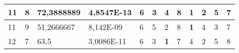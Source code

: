 \documentclass[conference]{IEEEtran}
\begin{document}
\begin{table*}[]
\begin{tabular}{|llll|llllllll|}
\multicolumn{1}{|l|}{11}                                                    & \multicolumn{1}{l|}{8}                                                        & \multicolumn{1}{l|}{72,3888889}                                                   & 4,8547E-13                     & \multicolumn{1}{l|}{6}                                                  & \multicolumn{1}{l|}{3}                                                  & \multicolumn{1}{l|}{4}                                                  & \multicolumn{1}{l|}{8}                                                  & \multicolumn{1}{l|}{\textbf{1}}                                         & \multicolumn{1}{l|}{2}                                                  & \multicolumn{1}{l|}{5}                                                  & 7                          \\ \hline
\multicolumn{1}{|l|}{11}                                                    & \multicolumn{1}{l|}{9}                                                        & \multicolumn{1}{l|}{51,2666667}                                                   & 8,142E-09                      & \multicolumn{1}{l|}{6}                                                  & \multicolumn{1}{l|}{5}                                                  & \multicolumn{1}{l|}{2}                                                  & \multicolumn{1}{l|}{8}                                                  & \multicolumn{1}{l|}{\textbf{1}}                                         & \multicolumn{1}{l|}{4}                                                  & \multicolumn{1}{l|}{3}                                                  & 7                          \\ \hline
\multicolumn{1}{|l|}{12}                                                    & \multicolumn{1}{l|}{7}                                                        & \multicolumn{1}{l|}{63,5}                                                         & 3,0086E-11                     & \multicolumn{1}{l|}{6}                                                  & \multicolumn{1}{l|}{3}                                                  & \multicolumn{1}{l|}{\textbf{1}}                                         & \multicolumn{1}{l|}{7}                                                  & \multicolumn{1}{l|}{4}                                                  & \multicolumn{1}{l|}{2}                                                  & \multicolumn{1}{l|}{5}                                                  & 8                          \\ \hline

\end{tabular}
\end{table*}
\end{document}
